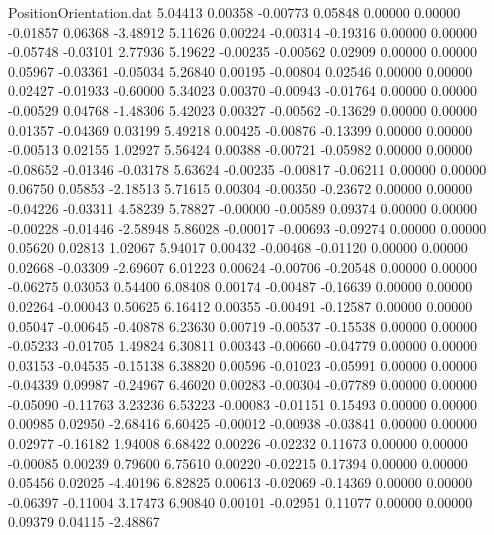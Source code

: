 \begin{filecontents}{PositionOrientation.dat}
   5.04413    0.00358   -0.00773     0.05848    0.00000    0.00000   -0.01857    0.06368   -3.48912
   5.11626    0.00224   -0.00314    -0.19316    0.00000    0.00000   -0.05748   -0.03101    2.77936
   5.19622   -0.00235   -0.00562     0.02909    0.00000    0.00000    0.05967   -0.03361   -0.05034
   5.26840    0.00195   -0.00804     0.02546    0.00000    0.00000    0.02427   -0.01933   -0.60000
   5.34023    0.00370   -0.00943    -0.01764    0.00000    0.00000   -0.00529    0.04768   -1.48306
   5.42023    0.00327   -0.00562    -0.13629    0.00000    0.00000    0.01357   -0.04369    0.03199
   5.49218    0.00425   -0.00876    -0.13399    0.00000    0.00000   -0.00513    0.02155    1.02927
   5.56424    0.00388   -0.00721    -0.05982    0.00000    0.00000   -0.08652   -0.01346   -0.03178
   5.63624   -0.00235   -0.00817    -0.06211    0.00000    0.00000    0.06750    0.05853   -2.18513
   5.71615    0.00304   -0.00350    -0.23672    0.00000    0.00000   -0.04226   -0.03311    4.58239
   5.78827   -0.00000   -0.00589     0.09374    0.00000    0.00000   -0.00228   -0.01446   -2.58948
   5.86028   -0.00017   -0.00693    -0.09274    0.00000    0.00000    0.05620    0.02813    1.02067
   5.94017    0.00432   -0.00468    -0.01120    0.00000    0.00000    0.02668   -0.03309   -2.69607
   6.01223    0.00624   -0.00706    -0.20548    0.00000    0.00000   -0.06275    0.03053    0.54400
   6.08408    0.00174   -0.00487    -0.16639    0.00000    0.00000    0.02264   -0.00043    0.50625
   6.16412    0.00355   -0.00491    -0.12587    0.00000    0.00000    0.05047   -0.00645   -0.40878
   6.23630    0.00719   -0.00537    -0.15538    0.00000    0.00000   -0.05233   -0.01705    1.49824
   6.30811    0.00343   -0.00660    -0.04779    0.00000    0.00000    0.03153   -0.04535   -0.15138
   6.38820    0.00596   -0.01023    -0.05991    0.00000    0.00000   -0.04339    0.09987   -0.24967
   6.46020    0.00283   -0.00304    -0.07789    0.00000    0.00000   -0.05090   -0.11763    3.23236
   6.53223   -0.00083   -0.01151     0.15493    0.00000    0.00000    0.00985    0.02950   -2.68416
   6.60425   -0.00012   -0.00938    -0.03841    0.00000    0.00000    0.02977   -0.16182    1.94008
   6.68422    0.00226   -0.02232     0.11673    0.00000    0.00000   -0.00085    0.00239    0.79600
   6.75610    0.00220   -0.02215     0.17394    0.00000    0.00000    0.05456    0.02025   -4.40196
   6.82825    0.00613   -0.02069    -0.14369    0.00000    0.00000   -0.06397   -0.11004    3.17473
   6.90840    0.00101   -0.02951     0.11077    0.00000    0.00000    0.09379    0.04115   -2.48867

\end{filecontents}
